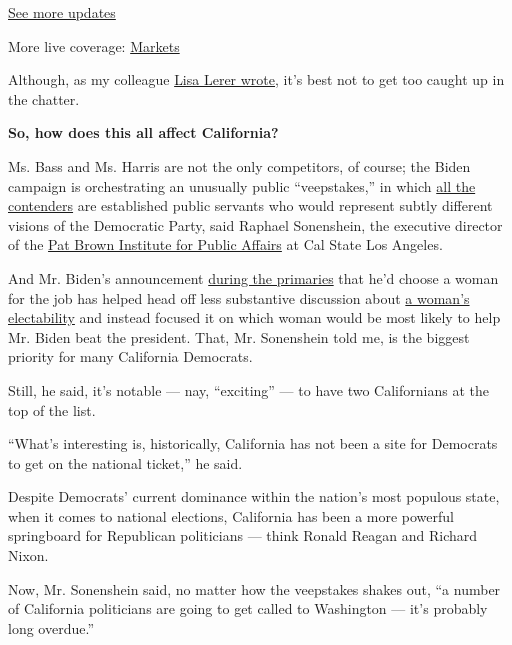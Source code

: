 \href{https://www.nytimes.com/2020/08/04/world/coronavirus-cases.html?action=click\&pgtype=Article\&state=default\&region=MAIN_CONTENT_1\&context=storylines_live_updates}{See
more updates}

More live coverage:
\href{https://www.nytimes.com/live/2020/08/04/business/stock-market-today-coronavirus?action=click\&pgtype=Article\&state=default\&region=MAIN_CONTENT_1\&context=storylines_live_updates}{Markets}

Although, as my colleague
\href{https://www.nytimes.com/2020/08/03/us/politics/joe-biden-vp.html}{Lisa
Lerer wrote}, it's best not to get too caught up in the chatter.

\textbf{So, how does this all affect California?}

Ms. Bass and Ms. Harris are not the only competitors, of course; the
Biden campaign is orchestrating an unusually public ``veepstakes,'' in
which
\href{https://www.nytimes.com/article/biden-vice-president-2020.html?}{all
the contenders} are established public servants who would represent
subtly different visions of the Democratic Party, said Raphael
Sonenshein, the executive director of the
\href{https://calstatela.patbrowninstitute.org/}{Pat Brown Institute for
Public Affairs} at Cal State Los Angeles.

And Mr. Biden's announcement
\href{https://www.nytimes.com/2020/03/16/us/politics/joe-biden-vp-running-mate.html}{during
the primaries} that he'd choose a woman for the job has helped head off
less substantive discussion about
\href{https://www.nytimes.com/2020/03/05/us/warren-presidential-race-2020.html}{a
woman's electability} and instead focused it on which woman would be
most likely to help Mr. Biden beat the president. That, Mr. Sonenshein
told me, is the biggest priority for many California Democrats.

Still, he said, it's notable --- nay, ``exciting'' --- to have two
Californians at the top of the list.

``What's interesting is, historically, California has not been a site
for Democrats to get on the national ticket,'' he said.

Despite Democrats' current dominance within the nation's most populous
state, when it comes to national elections, California has been a more
powerful springboard for Republican politicians --- think Ronald Reagan
and Richard Nixon.

Now, Mr. Sonenshein said, no matter how the veepstakes shakes out, ``a
number of California politicians are going to get called to Washington
--- it's probably long overdue.''

